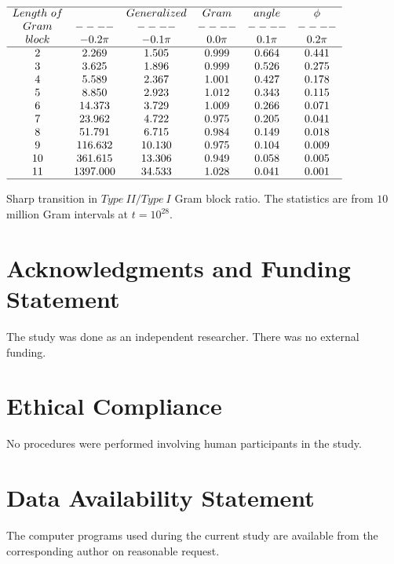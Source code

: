 \documentclass[twoside]{article}
\begin{document}
\begin{table}
\centering \(\begin{array}{cccccc}
\hline
Length~of  && Generalized &Gram&angle &\phi \\
Gram     &----&----&----&----&----\\
block  & -0.2\pi & -0.1\pi & 0.0\pi & 0.1\pi & 0.2\pi  \\
\hline
2 &2.269 &1.505 &0.999 &0.664 &0.441 \\
3 &3.625 &1.896 &0.999 &0.526 &0.275 \\
4 &5.589 &2.367 &1.001 &0.427 &0.178 \\
5 &8.850 &2.923 &1.012 &0.343 &0.115 \\
6 &14.373 &3.729 &1.009 &0.266 &0.071 \\
7 &23.962 &4.722 &0.975 &0.205 &0.041 \\
8 &51.791 &6.715 &0.984 &0.149 &0.018 \\
9 &116.632 &10.130 &0.975 &0.104 &0.009 \\
10 &361.615 &13.306 &0.949 &0.058 &0.005 \\
11 &1397.000 &34.533 &1.028 &0.041 &0.001 \\
\hline
\end{array}\)
\caption{Sharp transition in $Type~II/Type~I$ Gram block ratio.
The statistics are from $10$ million Gram intervals at $t=10^{28}$.}
\label{tab:ratioE28}
\end{table}


\section*{Acknowledgments and Funding Statement}

 The study was done as an independent researcher. There was no
external funding.

\section*{Ethical Compliance}

 No procedures were performed  involving human participants in the study.

\section*{Data Availability Statement}

The computer programs used during the current study are
available from the corresponding author on reasonable request.
\end{document}

